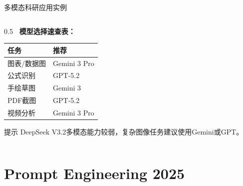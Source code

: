 \documentclass[aspectratio=169,11pt]{beamer}
\begin{document}
\begin{frame}{多模态科研应用实例}
\begin{columns}
\begin{column}{0.5\textwidth}
            \vspace{0.3cm}
            \textbf{\faTable\ 模型选择速查表：}
            \begin{tabular}{p{2.5cm}p{2.5cm}}
                \toprule
                \textbf{任务} & \textbf{推荐} \\
                \midrule
                图表/数据图 & Gemini 3 Pro \\
                公式识别 & GPT-5.2 \\
                手绘草图 & Gemini 3 \\
                PDF截图 & GPT-5.2 \\
                视频分析 & Gemini 3 Pro \\
                \bottomrule
            \end{tabular}
            
            \vspace{0.2cm}
            \begin{alertblock}{\small 提示}
                \footnotesize
                DeepSeek V3.2多模态能力较弱，复杂图像任务建议使用Gemini或GPT。
            \end{alertblock}
        \end{column}
    \end{columns}
\end{frame}

\section{Prompt Engineering 2025}
\end{document}
